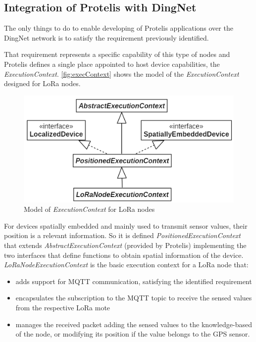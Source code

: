 \subsection{Integration of Protelis with DingNet}
The only things to do to enable developing of Protelis applications over the DingNet network is to satisfy the requirement previously identified.

That requirement represents a specific capability of this type of nodes and Protelis defines a single place appointed to host device capabilities, the \mbox{\textit{ExecutionContext}}.
\autoref{fig:execContext} shows the model of the \mbox{\textit{ExecutionContext}} designed for LoRa nodes. 
\begin{figure}[H]
    \centering
    \includegraphics{figures/execContext.png}
    \caption{Model of \textit{ExecutionContext} for LoRa nodes}
    \label{fig:execContext}
\end{figure}
\noindent For devices spatially embedded and mainly used to transmit sensor values, their position is a relevant information. So it is defined \mbox{\textit{PositionedExecutionContext}} that extends \mbox{\textit{AbstractExecutionContext}} (provided by Protelis) implementing the two interfaces that define functions to obtain spatial information of the device.
\mbox{\textit{LoRaNodeExecutionContext}} is the basic execution context for a LoRa node that:
% 
\begin{itemize}
    \item adds support for MQTT communication, satisfying the identified requirement
    \item encapsulates the subscription to the MQTT topic to receive the sensed values from the respective LoRa mote
    \item manages the received packet adding the sensed values to the knowledge-based of the node, or modifying its position if the value belongs to the GPS sensor.
\end{itemize}
